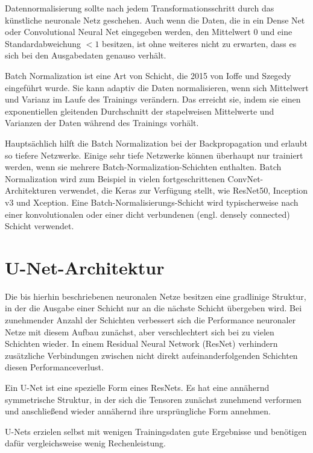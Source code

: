 Datennormalisierung sollte nach jedem Transformationsschritt durch das künstliche neuronale Netz geschehen. Auch wenn die Daten, die in ein Dense Net oder Convolutional Neural Net eingegeben werden, den Mittelwert $0$ und eine Standardabweichung $< 1$ besitzen, ist ohne weiteres nicht zu erwarten, dass es sich bei den Ausgabedaten genauso verhält.

Batch Normalization ist eine Art von Schicht, die 2015 von Ioffe und Szegedy \cite{ioffe2015batchnorm} eingeführt wurde. Sie kann adaptiv die Daten normalisieren, wenn sich Mittelwert und Varianz im Laufe des Trainings verändern. Das erreicht sie, indem sie einen exponentiellen gleitenden Durchschnitt der stapelweisen Mittelwerte und Varianzen der Daten während des Trainings vorhält.

Hauptsächlich hilft die Batch Normalization bei der Backpropagation und erlaubt so tiefere Netzwerke. Einige sehr tiefe Netzwerke können überhaupt nur trainiert werden, wenn sie mehrere Batch-Normalization-Schichten enthalten. Batch Normalization wird zum Beispiel in vielen fortgeschrittenen ConvNet-Architekturen verwendet, die Keras zur Verfügung stellt, wie ResNet50, Inception v3 und Xception. Eine Batch-Normalisierungs-Schicht wird typischerweise nach einer konvolutionalen oder einer dicht verbundenen (engl. densely connected) Schicht verwendet.
\cite{chollet2021deep}

\section{U-Net-Architektur}
\label{sec:unet}
Die bis hierhin beschriebenen neuronalen Netze besitzen eine gradlinige Struktur, in der die Ausgabe einer Schicht nur an die nächste Schicht übergeben wird. Bei zunehmender Anzahl der Schichten verbessert sich die Performance neuronaler Netze mit diesem Aufbau zunächst, aber verschlechtert sich bei zu vielen Schichten wieder. In einem Residual Neural Network (ResNet) verhindern zusätzliche Verbindungen zwischen nicht direkt aufeinanderfolgenden Schichten diesen Performanceverlust.

Ein U-Net ist eine spezielle Form eines ResNets. Es hat eine annähernd symmetrische Struktur, in der sich die Tensoren zunächst zunehmend verformen und anschließend wieder annähernd ihre ursprüngliche Form annehmen.

U-Nets erzielen selbst mit wenigen Trainingsdaten gute Ergebnisse und benötigen dafür vergleichsweise wenig Rechenleistung.

\cite{he2015deep}

